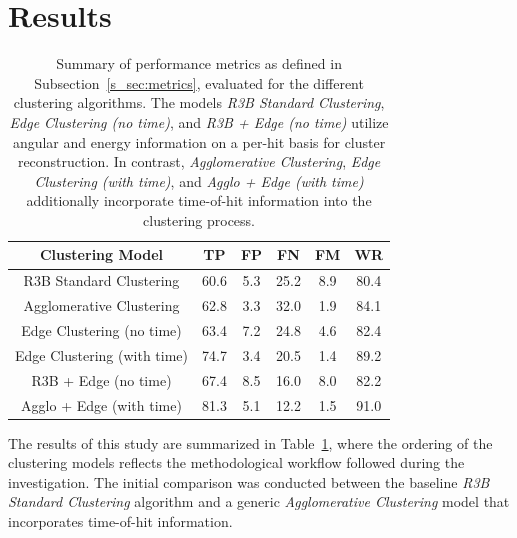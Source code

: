 \documentclass[final,5p,times,twocolumn]{elsarticle}
\begin{document}
\section{Results}\label{sec:results}
\begin{table}[h!]
\begin{center}
\begin{tabular}{||c| c| c |c | c|| c|}
 \hline
 Clustering Model & TP & FP & FN & FM & WR \\ [0.5ex] 
 \hline\hline
 R3B Standard Clustering & 60.6 & 5.3 & 25.2 & 8.9 & 80.4 \\ 
 \hline
 Agglomerative Clustering & 62.8 & 3.3 & 32.0 & 1.9 & 84.1 \\ 
 \hline
 Edge Clustering (no time) & 63.4 & 7.2 & 24.8 & 4.6 & 82.4 \\ 
 \hline
 Edge Clustering (with time) & 74.7 & 3.4 & 20.5 & 1.4 & 89.2 \\ 
 \hline
 R3B + Edge (no time) & 67.4 & 8.5 & 16.0 & 8.0 & 82.2 \\ 
 \hline
 Agglo + Edge (with time) & 81.3 & 5.1 & 12.2 & 1.5 & 91.0 \\
 \hline
\end{tabular}
\end{center}
\caption{Summary of performance metrics as defined in Subsection~\ref{s_sec:metrics}, evaluated for the different clustering algorithms. The models \textit{R3B Standard Clustering}, \textit{Edge Clustering (no time)}, and \textit{R3B + Edge (no time)} utilize angular and energy information on a per-hit basis for cluster reconstruction. In contrast, \textit{Agglomerative Clustering}, \textit{Edge Clustering (with time)}, and \textit{Agglo + Edge (with time)} additionally incorporate time-of-hit information into the clustering process.}
\label{tab:results}
\end{table}
The results of this study are summarized in Table~\ref{tab:results}, where the ordering of the clustering models reflects the methodological workflow followed during the investigation. The initial comparison was conducted between the baseline \textit{R3B Standard Clustering} algorithm and a generic \textit{Agglomerative Clustering} model that incorporates time-of-hit information.\newline
\end{document}
